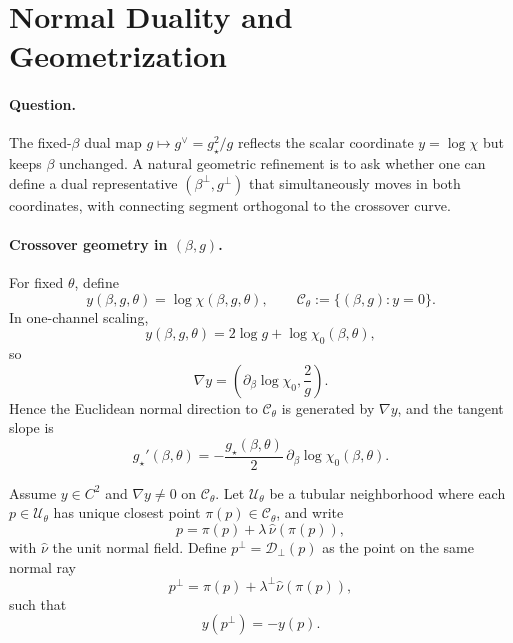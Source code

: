 \section{Normal Duality and Geometrization}
\label{sec:normal_duality}

\paragraph{Question.}
The fixed-\(\beta\) dual map \(g\mapsto g^\vee=g_\star^2/g\) reflects the scalar coordinate
\(y=\log\chi\) but keeps \(\beta\) unchanged. A natural geometric refinement is to ask whether one
can define a dual representative \((\beta^\perp,g^\perp)\) that simultaneously moves in both
coordinates, with connecting segment orthogonal to the crossover curve.

\paragraph{Crossover geometry in \((\beta,g)\).}
For fixed \(\theta\), define
\begin{equation}
  y(\beta,g,\theta)=\log\chi(\beta,g,\theta),
  \qquad
  \mathcal{C}_\theta:=\{(\beta,g):y=0\}.
\end{equation}
In one-channel scaling,
\begin{equation}
  y(\beta,g,\theta)=2\log g+\log\chi_0(\beta,\theta),
\end{equation}
so
\begin{equation}
  \nabla y
  =\left(\partial_\beta\log\chi_0,\frac{2}{g}\right).
\end{equation}
Hence the Euclidean normal direction to \(\mathcal{C}_\theta\) is generated by \(\nabla y\), and
the tangent slope is
\begin{equation}
  g_\star'(\beta,\theta)=-\frac{g_\star(\beta,\theta)}{2}\,\partial_\beta\log\chi_0(\beta,\theta).
\end{equation}

\begin{definition}
\label{def:normal_dual}
Assume \(y\in C^2\) and \(\nabla y\neq 0\) on \(\mathcal{C}_\theta\). Let \(\mathcal{U}_\theta\) be a
tubular neighborhood where each \(p\in\mathcal{U}_\theta\) has unique closest point
\(\pi(p)\in\mathcal{C}_\theta\), and write
\begin{equation}
  p=\pi(p)+\lambda\,\hat{\nu}(\pi(p)),
\end{equation}
with \(\hat{\nu}\) the unit normal field.
Define \(p^\perp=\mathcal{D}_\perp(p)\) as the point on the same normal ray
\begin{equation}
  p^\perp=\pi(p)+\lambda^\perp \hat{\nu}(\pi(p)),
\end{equation}
such that
\begin{equation}
  y(p^\perp)=-y(p).
\end{equation}
\end{definition}

